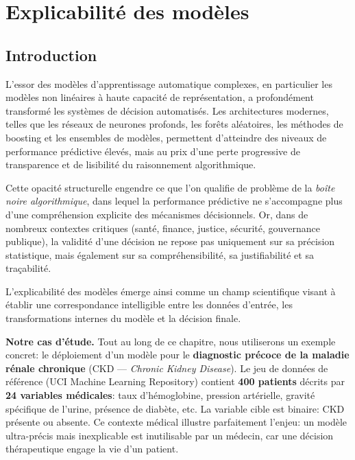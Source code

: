 \section{Explicabilité des modèles}

\subsection{Introduction}

L’essor des modèles d’apprentissage automatique complexes, en particulier les modèles non linéaires à haute capacité de représentation, a profondément transformé les systèmes de décision automatisés. Les architectures modernes, telles que les réseaux de neurones profonds, les forêts aléatoires, les méthodes de boosting et les ensembles de modèles, permettent d’atteindre des niveaux de performance prédictive élevés, mais au prix d’une perte progressive de transparence et de lisibilité du raisonnement algorithmique.

Cette opacité structurelle engendre ce que l’on qualifie de problème de la \textit{boîte noire algorithmique}, dans lequel la performance prédictive ne s’accompagne plus d’une compréhension explicite des mécanismes décisionnels. Or, dans de nombreux contextes critiques (santé, finance, justice, sécurité, gouvernance publique), la validité d’une décision ne repose pas uniquement sur sa précision statistique, mais également sur sa compréhensibilité, sa justifiabilité et sa traçabilité.

L’explicabilité des modèles émerge ainsi comme un champ scientifique visant à établir une correspondance intelligible entre les données d’entrée, les transformations internes du modèle et la décision finale.

\vspace{4pt}


\textbf{Notre cas d'étude.}
Tout au long de ce chapitre, nous utiliserons un exemple concret: le déploiement d'un modèle pour le \textbf{diagnostic précoce de la maladie rénale chronique} (CKD --- \emph{Chronic Kidney Disease}). Le jeu de données de référence (UCI Machine Learning Repository) contient \textbf{400 patients} décrits par \textbf{24 variables médicales}: taux d'hémoglobine, pression artérielle, gravité spécifique de l'urine, présence de diabète, etc. La variable cible est binaire: CKD présente ou absente. Ce contexte médical illustre parfaitement l'enjeu: un modèle ultra-précis mais inexplicable est inutilisable par un médecin, car une décision thérapeutique engage la vie d'un patient.

